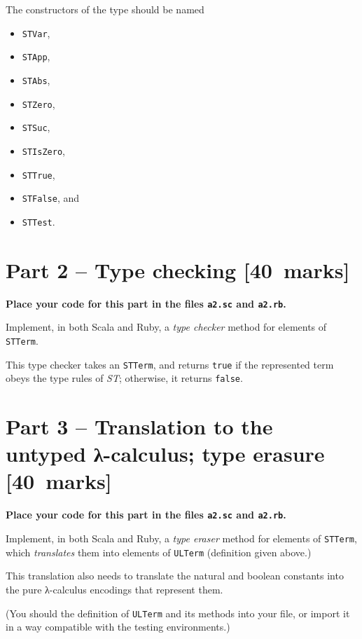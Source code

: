 \documentclass[11pt]{article}
\begin{document}
The constructors of the type should be named
\begin{itemize}
\item \texttt{STVar},
\item \texttt{STApp},
\item \texttt{STAbs},
\item \texttt{STZero},
\item \texttt{STSuc},
\item \texttt{STIsZero},
\item \texttt{STTrue},
\item \texttt{STFalse}, and
\item \texttt{STTest}.
\end{itemize}

\section*{Part 2 – Type checking                                       [40 marks]}
\label{sec:org184e964}
\begin{center}
\textbf{Place your code for this part in the files \texttt{a2.sc} and \texttt{a2.rb}.}
\end{center}

Implement, in both Scala and Ruby,
a \emph{type checker} method for elements of \texttt{STTerm}.

This type checker takes an \texttt{STTerm}, and returns \texttt{true} if
the represented term obeys the type rules of \emph{ST};
otherwise, it returns \texttt{false}.

\section*{Part 3 – Translation to the untyped λ-calculus; type erasure [40 marks]}
\label{sec:org30a85cd}
\begin{center}
\textbf{Place your code for this part in the files \texttt{a2.sc} and \texttt{a2.rb}.}
\end{center}

Implement, in both Scala and Ruby,
a \emph{type eraser} method for elements of \texttt{STTerm},
which \emph{translates} them into elements of \texttt{ULTerm} (definition given above.)

This translation also needs to translate the natural and boolean constants
into the pure λ-calculus encodings that represent them.

(You should the definition of \texttt{ULTerm} and its methods into your file,
or import it in a way compatible with the testing environments.)
\end{document}
